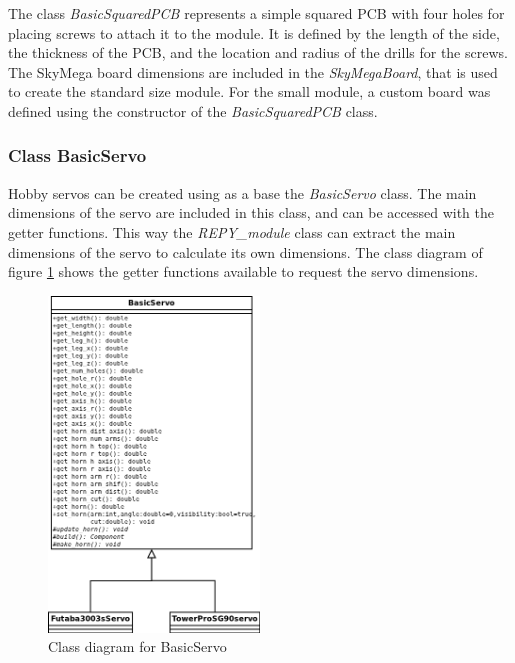 The class \emph{BasicSquaredPCB} represents a simple squared PCB with four holes for placing screws to attach it to the module. It is defined by the length of the side, the thickness of the PCB, and the location and radius of the drills for the screws.\\

The SkyMega board dimensions are included in the \emph{SkyMegaBoard}, that is used to create the standard size module. For the small module, a custom board was defined using the constructor of the \emph{BasicSquaredPCB}  class.\\


\subsubsection{Class BasicServo}

Hobby servos can be created using as a base the \emph{BasicServo} class. The main dimensions of the servo are included in this class, and can be accessed with the getter functions. This way the \emph{REPY\_module} class can extract the main dimensions of the servo to calculate its own dimensions. The class diagram of figure \ref{fig:hardware_class_diagram_BasicServo} shows the getter functions available to request the servo dimensions.\\

\begin{figure}[h]
		\centering
        \includegraphics[width=0.5\textwidth]{images/REPY2_class_diagram_BasicServo.png}
        \caption{Class diagram for BasicServo}
        \label{fig:hardware_class_diagram_BasicServo}
\end{figure} 

